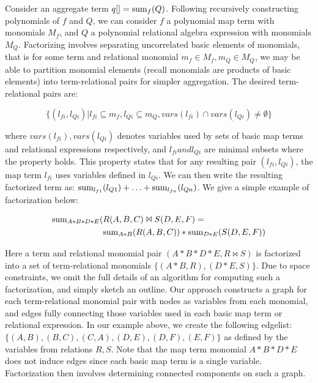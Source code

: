 Consider an aggregate term $q[] = \mathrm{sum}_{f}(Q)$. Following recursively
constructing polynomials of $f$ and $Q$, we can consider $f$ a polynomial map
term with monomials $M_f$, and $Q$ a polynomial relational algebra expression
with monomials $M_Q$. Factorizing involves separating uncorrelated basic
elements of monomials, that is for some term and relational monomial $m_f
\in M_f, m_Q \in M_Q$, we may be able to partition monomial elements (recall
monomials are products of basic elements) into term-relational pairs for simpler
aggregation. The desired term-relational pairs are:

\[\{(l_{fi},l_{Qi}) | l_{fi} \subseteq m_f, l_{Qi} \subseteq m_Q,
vars(l_{fi}) \cap vars(l_{Qi}) \neq \emptyset\}\]

\noindent where $vars(l_{fi}), vars(l_{Qi})$ denotes variables used by sets of basic
map terms and relational expressions respectively, and $l_{fi} and l_{Qi}$ are minimal
subsets where the property holds. This property states that for any resulting
pair $(l_{fi}, l_{Qi})$, the map term $l_{fi}$ uses variables defined in $l_{Qi}$. We can
then write the resulting factorized term as:
$\mathrm{sum}_{l_{f1}}(l_{Q1}) + \ldots + \mathrm{sum}_{l_{fn}}(l_{Qn})$.
We give a simple example of factorization below:

\begin{align*}
\mathrm{sum}_{A*B*D*E}( & R(A,B,C) \Join S(D,E,F) =\\
& \mathrm{sum}_{A*B}(R(A,B,C)) * \mathrm{sum}_{D*E}(S(D,E,F))
\end{align*}

Here a term and relational monomial pair $(A*B*D*E, R \Join S)$ is factorized
into a set of term-relational monomials $\{(A*B,R), (D*E,S)\}$. Due to space
constraints, we omit the full details of an algorithm for computing such a
factorization, and simply sketch an outline. Our approach constructs a graph for
each term-relational monomial pair with nodes as variables from each monomial,
and edges fully connecting those variables used in each basic map term or
relational expression. In our example above, we create the following edgelist:
$\{(A,B), (B,C), (C,A), (D,E), (D,F), (E,F)\}$ as defined by the variables from
relations $R,S$. Note that the map term monomial $A*B*D*E$ does not induce edges
since each basic map term is a single variable. Factorization then involves
determining connected components on such a graph.

